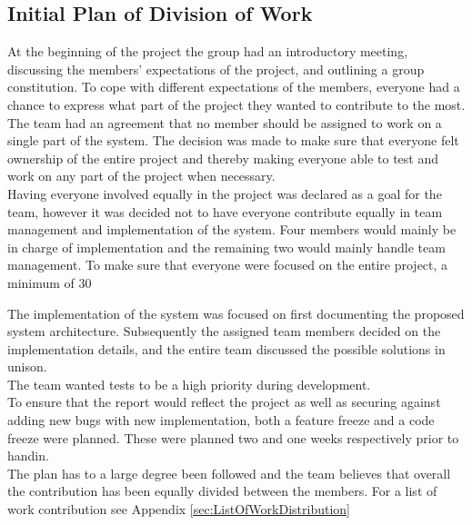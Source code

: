 \subsection{Initial Plan of Division of Work}
At the beginning of the project the group had an introductory meeting, discussing the members’ expectations of the project, and outlining a group constitution. \newline
To cope with different expectations of the members, everyone had a chance to express what part of the project they wanted to contribute to the most. The team had an agreement that no member should be assigned to work on a single part of the system. The decision was made to make sure that everyone felt ownership of the entire project and thereby making everyone able to test and work on any part of the project when necessary. \\

Having everyone involved equally in the project was declared as a goal for the team, however it was decided not to have everyone contribute equally in team management and implementation of the system. Four members would mainly be in charge of implementation and the remaining two would mainly handle team management. To make sure that everyone were focused on the entire project, a minimum of 30%

The implementation of the system was focused on first documenting the proposed system architecture. Subsequently the assigned team members decided on the implementation details, and the entire team discussed the possible solutions in unison.\\

The team wanted tests to be a high priority during development.\\

To ensure that the report would reflect the project as well as securing against adding new bugs with new implementation, both a feature freeze and a code freeze were planned. These were planned two and one weeks respectively prior to handin.\\

The plan has to a large degree been followed and the team believes that overall the contribution has been equally divided between the members. For a list of work contribution see Appendix \ref{sec:ListOfWorkDistribution} 